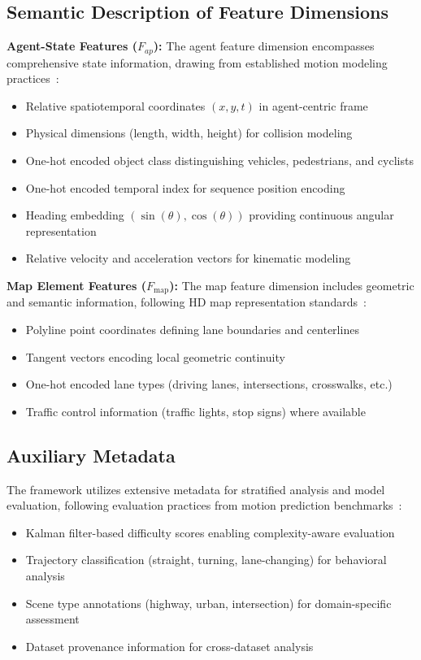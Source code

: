 \subsection{Semantic Description of Feature Dimensions}
\label{ssec:feature_semantics}

\textbf{Agent-State Features ($F_{ap}$):} The agent feature dimension encompasses comprehensive state information, drawing from established motion modeling practices~\cite{chai2019multipath, rupprecht2017learning}:
\begin{itemize}
    \item Relative spatiotemporal coordinates $(x, y, t)$ in agent-centric frame
    \item Physical dimensions (length, width, height) for collision modeling
    \item One-hot encoded object class distinguishing vehicles, pedestrians, and cyclists
    \item One-hot encoded temporal index for sequence position encoding
    \item Heading embedding $(\sin(\theta), \cos(\theta))$ providing continuous angular representation
    \item Relative velocity and acceleration vectors for kinematic modeling
\end{itemize}

\textbf{Map Element Features ($F_{\text{map}}$):} The map feature dimension includes geometric and semantic information, following HD map representation standards~\cite{av2Wilson2023, caesar2020nuscenes}:
\begin{itemize}
    \item Polyline point coordinates defining lane boundaries and centerlines
    \item Tangent vectors encoding local geometric continuity
    \item One-hot encoded lane types (driving lanes, intersections, crosswalks, etc.)
    \item Traffic control information (traffic lights, stop signs) where available
\end{itemize}

\subsection{Auxiliary Metadata}
\label{ssec:auxiliary_metadata}

The framework utilizes extensive metadata for stratified analysis and model evaluation, following evaluation practices from motion prediction benchmarks~\cite{WOMD2021, av2Wilson2023}:
\begin{itemize}
    \item Kalman filter-based difficulty scores enabling complexity-aware evaluation
    \item Trajectory classification (straight, turning, lane-changing) for behavioral analysis
    \item Scene type annotations (highway, urban, intersection) for domain-specific assessment
    \item Dataset provenance information for cross-dataset analysis
\end{itemize}

